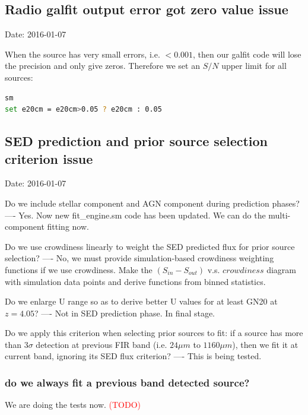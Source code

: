 \documentclass[11pt,a4paper]{article}
\begin{document}
\subsection{Radio galfit output error got zero value issue}

\textcolor{green!90!black!60!orange}{Date: 2016-01-07}

When the source has very small errors, i.e. $<0.001$, then our galfit code will lose the precision and only give zeros. Therefore we set an $S/N$ upper limit for all sources:

\begin{lstlisting}[language=bash]
sm
set e20cm = e20cm>0.05 ? e20cm : 0.05
\end{lstlisting}


\subsection{SED prediction and prior source selection criterion issue}

\textcolor{green!90!black!60!orange}{Date: 2016-01-07}

Do we include stellar component and AGN component during prediction phases? ---- Yes. Now new fit\_engine.sm code has been updated. We can do the multi-component fitting now. 

Do we use crowdiness linearly to weight the SED predicted flux for prior source selection? ---- No, we must provide simulation-based crowdiness weighting functions if we use crowdiness. Make the $(S_{in}-S_{out})$ v.s. $crowdiness$ diagram with simulation data points and derive functions from binned statistics. 

Do we enlarge U range so as to derive better U values for at least GN20 at $z=4.05$? ---- Not in SED prediction phase. In final stage. 

Do we apply this criterion when selecting prior sources to fit: if a source has more than $3\sigma$ detection at previous FIR band (i.e. $24{\mu}m$ to $1160{\mu}m$), then we fit it at current band, ignoring its SED flux criterion? ---- This is being tested. 

\subsubsection{do we always fit a previous band detected source?}

We are doing the tests now.
\textcolor{red}{(TODO)}
\end{document}
